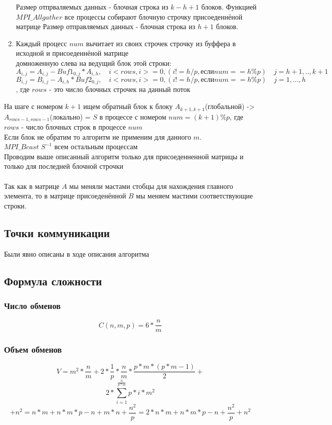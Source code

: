 \documentclass[a4paper,12pt]{article}
\begin{document}
\begin{enumerate}
    Размер отпрваляемых данных - блочная строка из $k - h + 1$ блоков.
    Функцией $MPI\_Allgather$ все процессы собирают блочную строчку присоеденнёной матрице
    Размер отправляемых данных - блочная строка из $h + 1$ блоков.
\item Каждый процесс $num$ вычитает из своих строчек строчку из буффера в исходной и присоеденнёной матрице\\
    домноженную слева на ведущий блок этой строки:
        $$A_{i, j} = A_{i, j} - Buf1_{0, j} * A_{i, h}, \quad i < rows, i>=0 , (i != h/p, если num==h\%p)
        \quad j = h + 1,..,k+1$$
        $$B_{i, j} = B_{i, j} - A_{i, h} * Buf2_{0, j}, \quad i < rows, i>= 0, (i != h/p, если num==h\%p) 
        \quad j = 1,...,h$$
    , где $rows$ - это число блочных строчек на данный поток\\

\end{enumerate}
На шаге с номером $k + 1$ ищем обратный блок к блоку $A_{k+1,k+1}$(глобальной) -> $A_{rows - 1, rows - 1}$(локально) = $S$
в процессе с номером $num = (k + 1)\%p$, где $rows$ - число блочных строк в процессе $num$\\
Если блок не обратим то алгоритм не применим для данного $m$.\\
$MPI\_Bcast$ $S^{-1}$ всем остальным процессам\\
Проводим выше описанный алгоритм только для присоеденненной матрицы и только для последней блочной строчки\\\\

Так как в матрице $A$ мы меняли мастами стобцы для нахождения главного элемента, то 
в матрице присоеденённой $B$ мы меняем мастими соответствующие строки.

\subsection{Точки коммуникации}
Были явно описаны в ходе описания алгоритма

\subsection{Формула сложности}
\subsubsection{Число обменов}
$$C(n, m, p) = 6 * \frac{n}{m}$$
\subsubsection{Объем обменов}
$$V = m^{2} * \frac{n}{m} + 2*\frac{1}{p} * \frac{n}{m} * \frac{p*m*(p*m - 1)}{2} +$$
$$2*\sum\limits_{i=1}^{\frac{n}{p * m}}p * i * m^{2}$$
$$+ n^{2} = n*m + n*m*p - n + m*n + \frac{n^{2}}{p} = 2*n*m + n*m*p -n + \frac{n^{2}}{p} + n^{2}$$
\end{document}
